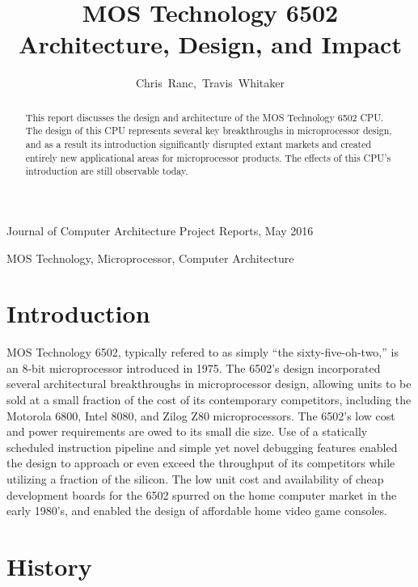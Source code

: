 \documentclass[journal]{IEEEtran}
\begin{document}
\title{MOS Technology 6502 \\ Architecture, Design, and Impact}

\author{Chris~Ranc,~Travis~Whitaker}

{Journal of Computer Architecture Project Reports, May 2016}

\maketitle

\begin{abstract}
This report discusses the design and architecture of the MOS Technology 6502
CPU. The design of this CPU represents several key breakthroughs in
microprocessor design, and as a result its introduction significantly disrupted
extant markets and created entirely new applicational areas for microprocessor
products. The effects of this CPU's introduction are still observable today.
\end{abstract}

\begin{IEEEkeywords}
MOS Technology, Microprocessor, Computer Architecture
\end{IEEEkeywords}

\IEEEpeerreviewmaketitle

\section{Introduction}

 MOS Technology 6502, typically refered to as simply
``the sixty-five-oh-two,'' is an 8-bit microprocessor introduced in 1975. The
6502's design incorporated several architectural breakthroughs in microprocessor
design, allowing units to be sold at a small fraction of the cost of its
contemporary competitors, including the Motorola 6800, Intel 8080, and Zilog Z80
microprocessors. The 6502's low cost and power requirements are owed to its
small die size. Use of a statically scheduled instruction pipeline and simple
yet novel debugging features enabled the design to approach or even exceed the
throughput of its competitors while utilizing a fraction of the silicon. The low
unit cost and availability of cheap development boards for the 6502 spurred on
the home computer market in the early 1980's, and enabled the design of
affordable home video game consoles.

\section{History}
\end{document}
